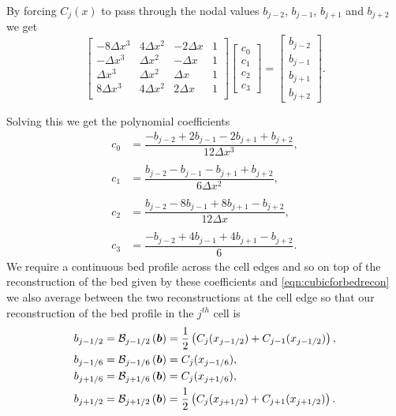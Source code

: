 By forcing $C_j(x)$ to pass through the nodal values $b_{j-2}$, $b_{j-1}$, $b_{j+1}$ and $b_{j+2}$ we get
\begin{equation*}
\begin{bmatrix}
-8\Delta x^3 & 4\Delta x^2  & -2\Delta x & 1\\
-\Delta x^3 & \Delta x^2  &-\Delta x & 1\\
\Delta x^3 & \Delta x^2  & \Delta x & 1\\
8\Delta x^3 & 4\Delta x^2  & 2\Delta x & 1\\
\end{bmatrix}
\begin{bmatrix}
c_0 \\ c_1 \\ c_2 \\ c_3\end{bmatrix} =  \begin{bmatrix}
b_{j-2} \\ b_{j-1}\\ b_{j+1} \\ b_{j+2}
\end{bmatrix}.
\end{equation*}

Solving this we get the polynomial coefficients
\begin{align*}
c_0 &=  \dfrac{-b_{j-2} + 2b_{j-1} - 2 b_{j+1} + b_{j+2}}{12 \Delta x^3},\\ \\
c_1 &=  \dfrac{b_{j-2} - b_{j-1} - b_{j+1} + b_{j+2}}{6 \Delta x^2},\\ \\
c_2 &=  \dfrac{b_{j-2} - 8b_{j-1} + 8 b_{j+1} - b_{j+2}}{12 \Delta x},\\ \\
c_3 &=  \dfrac{-b_{j-2}  + 4b_{j-1} + 4 b_{j+1} - b_{j+2}}{6}.
\end{align*}
We require a continuous bed profile across the cell edges and so on top of the reconstruction of the bed given by these coefficients and \eqref{eqn:cubicforbedrecon} we also average between the two reconstructions at the cell edge so that our reconstruction of the bed profile in the $j^{th}$ cell is
\begin{subequations}
\begin{align}
b_{j-1/2} &=  \mathcal{B}_{j-1/2}\left(\boldsymbol{b}\right) =  \frac{1}{2}\left( C_j(x_{j-1/2}) + C_{j-1}(x_{j-1/2})\right),\\
b_{j-1/6} &=  \mathcal{B}_{j-1/6}\left(\boldsymbol{b}\right) =  C_j(x_{j-1/6}),\\
b_{j+1/6} &=  \mathcal{B}_{j+1/6}\left(\boldsymbol{b}\right) =  C_j(x_{j+1/6}),\\
b_{j+1/2} &=  \mathcal{B}_{j+1/2}\left(\boldsymbol{b}\right) =  \frac{1}{2}\left( C_j(x_{j+1/2}) + C_{j+1}(x_{j+1/2})\right).
\end{align}
\label{eqn:FEVMbedrecon}
\end{subequations}


